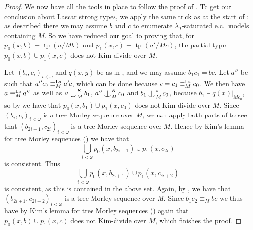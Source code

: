 \documentclass[a4paper, reqno]{amsart}
\theoremstyle{definition}
\theoremstyle{repeat}
\DeclareMathOperator{\tp}{tp}
\newcommand{\equivls}{\equiv^\textup{Ls}}
\def\Ind#1#2{#1\setbox0=\hbox{$#1x$}\kern\wd0\hbox to 0pt{\hss$#1\mid$\hss}
\lower.9\ht0\hbox to 0pt{\hss$#1\smile$\hss}\kern\wd0}
\def\ind{\mathop{\mathpalette\Ind{}}}
\begin{document}
\begin{proof}
We now have all the tools in place to follow the proof of \cite[Theorem 6.5]{kaplan_kim-independence_2020}. To get our conclusion about Lascar strong types, we apply the same trick as at the start of \cite[Theorem 7.7]{dobrowolski_kim-independence_2022}: as described there we may assume $b$ and $c$ to enumerate $\lambda_T$-saturated e.c.\ models containing $M$. So we have reduced our goal to proving that, for $p_0(x, b) = \tp(a/Mb)$ and $p_1(x, c) = \tp(a'/Mc)$, the partial type $p_0(x, b) \cup p_1(x, c)$ does not Kim-divide over $M$.

Let $(b_i, c_i)_{i < \omega}$ and $q(x,y)$ be as in , and we may assume $b_1 c_1 = bc$. Let $a''$ be such that $a'' c_0 \equivls_M a'c$, which can be done because $c = c_1 \equivls_M c_0$. We then have $a \equivls_M a''$ as well as $a \ind^K_M b_1$, $a'' \ind^K_M c_0$ and $b_1 \ind^*_M c_0$, because $b_1 \models q(x)|_{M c_0}$, so by  we have that $p_0(x, b_1) \cup p_1(x, c_0)$ does not Kim-divide over $M$. Since $(b_i, c_i)_{i < \omega}$ is a tree Morley sequence over $M$, we can apply both parts of  to see that $(b_{2i+1}, c_{2i})_{i < \omega}$ is a tree Morley sequence over $M$. Hence by Kim's lemma for tree Morley sequences () we have that
\[
\bigcup_{i < \omega} p_0(x, b_{2i+1}) \cup p_1(x, c_{2i})
\]
is consistent. Thus
\[
\bigcup_{i < \omega} p_0(x, b_{2i+1}) \cup p_1(x, c_{2i+2})
\]
is consistent, as this is contained in the above set. Again, by , we have that $(b_{2i+1}, c_{2i+2})_{i < \omega}$ is a tree Morley sequence over $M$. Since $b_1 c_2 \equiv_M bc$ we thus have by Kim's lemma for tree Morley sequences () again that $p_0(x, b) \cup p_1(x, c)$ does not Kim-divide over $M$, which finishes the proof.
\end{proof}




\end{document}
